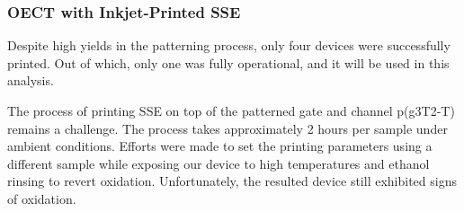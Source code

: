 \newpage
\subsubsection{OECT with Inkjet-Printed SSE}%

Despite high yields in the patterning process, only four devices were successfully printed. Out of which, only one was fully operational, and it will be used in this analysis.

The process of printing SSE on top of the patterned gate and channel p(g3T2-T) remains a challenge. The process takes approximately 2 hours per sample under ambient conditions. Efforts were made to set the printing parameters using a different sample while exposing our device to high temperatures and ethanol rinsing to revert oxidation. Unfortunately, the resulted device still exhibited signs of oxidation.

